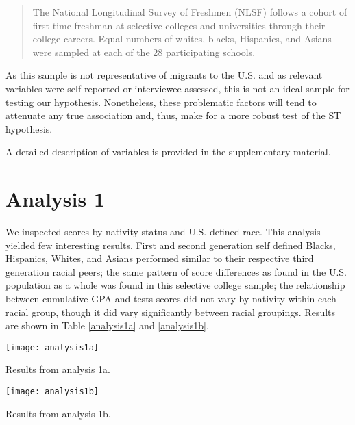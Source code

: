 \documentclass[a4paper,12pt]{article}
\begin{document}
\begin{quote}
The National Longitudinal Survey of Freshmen (NLSF) follows a cohort of first-time freshman at selective colleges and universities through their college careers. Equal numbers of whites, blacks, Hispanics, and Asians were sampled at each of the 28 participating schools.
\end{quote}

As this sample is not representative of migrants to the U.S. and as relevant variables were self reported or interviewee assessed, this is not an ideal sample for testing our hypothesis. Nonetheless, these problematic factors will tend to attenuate any true association and, thus, make for a more robust test of the ST hypothesis.

A detailed description of variables is provided in the supplementary material.

\section{Analysis 1}
We inspected scores by nativity status and U.S. defined race. This analysis yielded few interesting results. First and second generation self defined Blacks, Hispanics, Whites, and Asians performed similar to their respective third generation racial peers; the same pattern of score differences as found in the U.S. population as a whole was found in this selective college sample; the relationship between cumulative GPA and tests scores did not vary by nativity within each racial group, though it did vary significantly between racial groupings. Results are shown in Table \ref{analysis1a} and \ref{analysis1b}.

\begin{table}[H]
\texttt{[image: analysis1a]}
\caption{Results from analysis 1a.}\label{analysis1a}
\end{table}

\begin{table}[H]
\centering
\texttt{[image: analysis1b]}
\caption{Results from analysis 1b.}\label{analysis1b}
\end{table}
\end{document}
